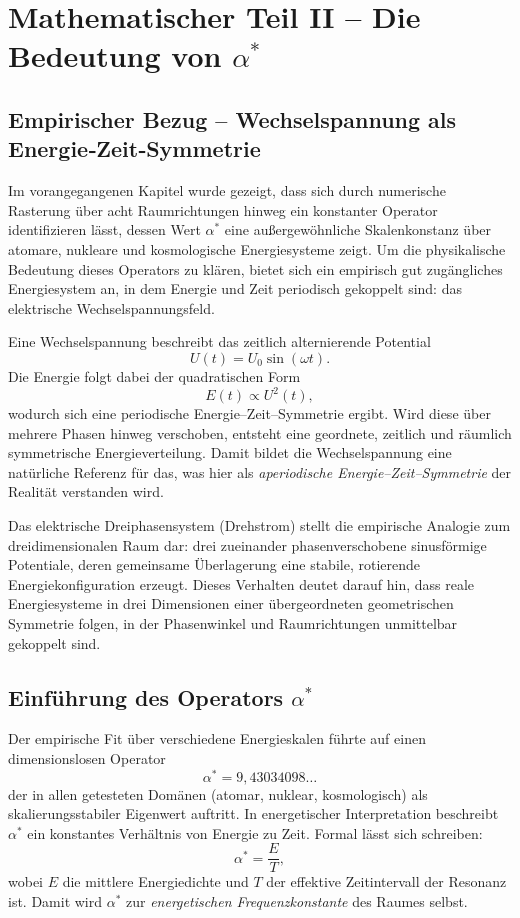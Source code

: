 \chapter{Mathematischer Teil II – Die Bedeutung von $\alpha^*$}
\label{chap:mathematischer_rahmen_II}

\section{Empirischer Bezug – Wechselspannung als Energie‐Zeit‐Symmetrie}

Im vorangegangenen Kapitel wurde gezeigt, dass sich durch numerische Rasterung
über acht Raumrichtungen hinweg ein konstanter Operator identifizieren lässt,
dessen Wert $\alpha^*$ eine außergewöhnliche Skalenkonstanz über atomare,
nukleare und kosmologische Energiesysteme zeigt.
Um die physikalische Bedeutung dieses Operators zu klären,
bietet sich ein empirisch gut zugängliches Energiesystem an,
in dem Energie und Zeit periodisch gekoppelt sind:
das elektrische Wechselspannungsfeld.

Eine Wechselspannung beschreibt das zeitlich alternierende Potential
\[
U(t) = U_0 \sin(\omega t).
\]
Die Energie folgt dabei der quadratischen Form
\[
E(t) \propto U^2(t),
\]
wodurch sich eine periodische Energie–Zeit–Symmetrie ergibt.
Wird diese über mehrere Phasen hinweg verschoben,
entsteht eine geordnete, zeitlich und räumlich
symmetrische Energieverteilung.
Damit bildet die Wechselspannung eine natürliche Referenz
für das, was hier als \emph{aperiodische Energie–Zeit–Symmetrie}
der Realität verstanden wird.

Das elektrische Dreiphasensystem (Drehstrom)
stellt die empirische Analogie zum dreidimensionalen Raum dar:
drei zueinander phasenverschobene sinusförmige Potentiale,
deren gemeinsame Überlagerung eine stabile, rotierende
Energiekonfiguration erzeugt.
Dieses Verhalten deutet darauf hin, dass reale Energiesysteme
in drei Dimensionen einer übergeordneten geometrischen Symmetrie folgen,
in der Phasenwinkel und Raumrichtungen unmittelbar gekoppelt sind.

\section{Einführung des Operators $\alpha^*$}

Der empirische Fit über verschiedene Energieskalen
führte auf einen dimensionslosen Operator
\[
\alpha^* = 9{,}43034098\dots
\]
der in allen getesteten Domänen (atomar, nuklear, kosmologisch)
als skalierungsstabiler Eigenwert auftritt.
In energetischer Interpretation beschreibt $\alpha^*$
ein konstantes Verhältnis von Energie zu Zeit.
Formal lässt sich schreiben:
\[
\alpha^* = \frac{E}{T},
\]
wobei $E$ die mittlere Energiedichte
und $T$ der effektive Zeitintervall der Resonanz ist.
Damit wird $\alpha^*$ zur \emph{energetischen Frequenzkonstante}
des Raumes selbst.


